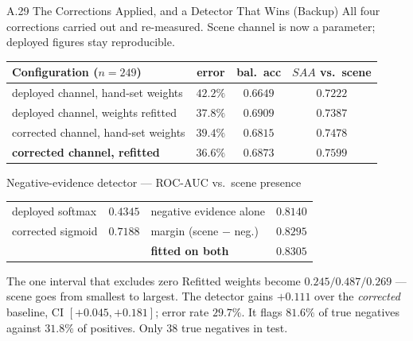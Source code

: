 \documentclass[aspectratio=169,11pt]{beamer}
\begin{document}
\begin{frame}{A.29 The Corrections Applied, and a Detector That Wins (Backup)}
\scriptsize
All four corrections carried out and re-measured. Scene channel is now a parameter; deployed figures stay reproducible.
\vspace{0.5mm}
\begin{center}\scriptsize
\begin{tabular}{@{}l c c c@{}}
\toprule
\textbf{Configuration} ($n=249$) & \textbf{error} & \textbf{bal.\ acc} & \textbf{$SAA$ vs.\ scene} \\
\midrule
deployed channel, hand-set weights & $42.2\%$ & $0.6649$ & $0.7222$ \\
deployed channel, weights refitted & $37.8\%$ & $0.6909$ & $0.7387$ \\
corrected channel, hand-set weights & $39.4\%$ & $0.6815$ & $0.7478$ \\
\textbf{corrected channel, refitted} & $\mathbf{36.6\%}$ & $0.6873$ & $\mathbf{0.7599}$ \\
\bottomrule
\end{tabular}
\end{center}
\vspace{-1mm}
\begin{center}\scriptsize
Negative-evidence detector --- ROC-AUC vs.\ scene presence
\vspace{0.5mm}

\begin{tabular}{@{}l c l c@{}}
\toprule
deployed softmax & $0.4345$ & negative evidence alone & $0.8140$ \\
corrected sigmoid & $0.7188$ & margin (scene $-$ neg.) & $0.8295$ \\
& & \textbf{fitted on both} & $\mathbf{0.8305}$ \\
\bottomrule
\end{tabular}
\end{center}
\vspace{-2mm}
\begin{alertblock}{\scriptsize The one interval that excludes zero}
\scriptsize Refitted weights become $0.245/0.487/0.269$ --- scene goes from smallest to largest. The detector gains $\mathbf{+0.111}$ over the \emph{corrected} baseline, CI $[+0.045,+0.181]$; error rate $\mathbf{29.7\%}$. It flags $81.6\%$ of true negatives against $31.8\%$ of positives. Only $38$ true negatives in test.
\end{alertblock}
\end{frame}
\end{document}
